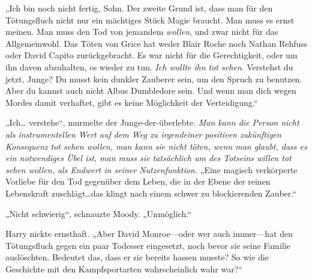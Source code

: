 „Ich bin noch nicht fertig, Sohn. Der zweite Grund ist, dass man für den Tötungsfluch nicht nur ein mächtiges Stück Magie braucht. Man muss es ernst meinen. Man muss den Tod von jemandem \emph{wollen}, und zwar nicht für das Allgemeinwohl. Das Töten von Grice hat weder Blair Roche noch Nathan Rehfuss oder David Capito zurückgebracht. Es war nicht für die Gerechtigkeit, oder um ihn davon abzuhalten, es wieder zu tun. \emph{Ich wollte ihn tot sehen}. Verstehst du jetzt, Junge? Du musst kein dunkler Zauberer sein, um den Spruch zu benutzen. Aber du kannst auch nicht Albus Dumbledore sein. Und wenn man dich wegen Mordes damit verhaftet, gibt es keine Möglichkeit der Verteidigung.“

„Ich… verstehe“, murmelte der Junge-der-überlebte.
\emph{Man kann die Person nicht als instrumentellen Wert auf dem Weg zu irgendeiner positiven zukünftigen Konsequenz tot sehen wollen, man kann sie nicht töten, wenn man glaubt, dass es ein notwendiges Übel ist, man muss sie tatsächlich um des Totseins willen tot sehen wollen, als Endwert in seiner Nutzenfunktion.}
„Eine magisch verkörperte Vorliebe für den Tod gegenüber dem Leben, die in der Ebene der reinen Lebenskraft zuschlägt…das klingt nach einem schwer zu blockierenden Zauber.“

„Nicht schwierig“, schnauzte Moody. „Unmöglich.“

Harry nickte ernsthaft.
„Aber David Monroe—oder wer auch immer—hat den Tötungsfluch gegen ein paar Todesser eingesetzt, noch bevor sie seine Familie auslöschten. Bedeutet das, dass er sie bereits hassen musste? So wie die Geschichte mit den Kampfsportarten wahrscheinlich wahr war?“

